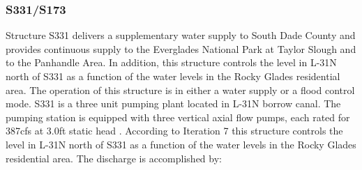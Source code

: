 %
%





\clearpage
\subsubsection{S331/S173}
Structure S331 delivers a supplementary water supply to South Dade County and provides continuous supply to the Everglades National Park at Taylor Slough and to the Panhandle Area. In addition, this structure controls the level in L-31N north of S331 as a function of the water levels in the Rocky Glades residential area. The operation of this structure is in either a water supply or a flood control mode. S331 is a three unit pumping plant located in L-31N borrow canal. The pumping station is equipped with three vertical axial flow pumps, each rated for 387cfs at 3.0ft static head \cite{SFWMD1994}. According to Iteration 7 this structure controls the level in L-31N north of S331 as a function of the water levels in the Rocky Glades residential area\cite{SFWMD1994}.  The discharge is accomplished by:

